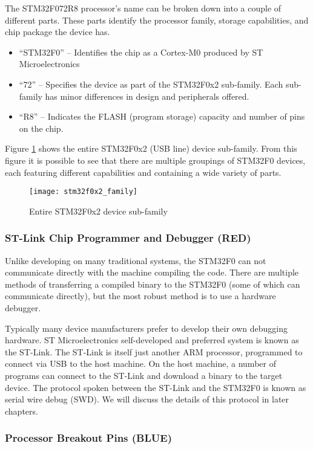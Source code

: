 \documentclass[11pt,fleqn]{book} %
\begin{document}
The STM32F072R8 processor's name can be broken down into a couple of different parts. These parts identify the processor family, storage capabilities, and chip package the device has.

\begin{itemize}
	\item ``STM32F0'' -- Identifies the chip as a Cortex-M0 produced by ST Microelectronics
	\item ``72'' -- Specifies the device as part of the STM32F0x2 sub-family. Each sub-family has minor differences in design and peripherals offered.
	\item ``R8'' -- Indicates the FLASH (program storage) capacity and number of pins on the chip.  
\end{itemize} 

Figure \ref{f072_family} shows the entire STM32F0x2 (USB line) device sub-family. From this figure it is possible to see that there are multiple groupings of STM32F0 devices, each featuring different capabilities and containing a wide variety of parts.

\begin{figure}[]
	\centering\texttt{[image: stm32f0x2\_family]}
	\caption{Entire STM32F0x2 device sub-family}
	\label{f072_family}
\end{figure}

\subsubsection*{ST-Link Chip Programmer and Debugger ({\color{red!90!black}RED})}
Unlike developing on many traditional systems, the STM32F0 can not communicate directly with the machine compiling the code. There are multiple methods of transferring a compiled binary to the STM32F0 (some of which can communicate directly), but the most robust method is to use a hardware debugger.

Typically many device manufacturers prefer to develop their own debugging hardware. ST Microelectronics self-developed and preferred system is known as the ST-Link. The ST-Link is itself just another ARM processor, programmed to connect via USB to the host machine. On the host machine, a number of programs can connect to the ST-Link and download a binary to the target device. The protocol spoken between the ST-Link and the STM32F0 is known as serial wire debug (SWD).  We will discuss the details of this protocol in later chapters.

\subsubsection*{Processor Breakout Pins ({\color{blue!90!black}BLUE})}	
\end{document}
